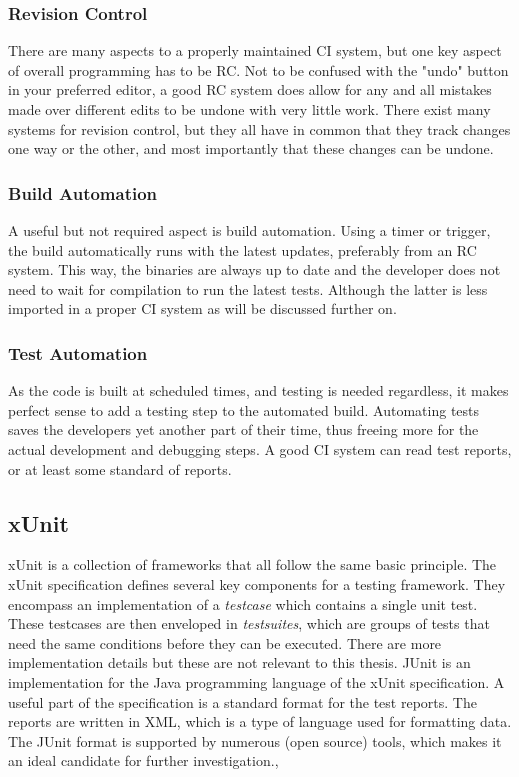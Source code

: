 \documentclass[11pt,british]{article}
\begin{document}
\subsubsection{Revision Control}
There are many aspects to a properly maintained \gls{CI} system, but one key aspect of overall programming has to be \gls{RC}. Not to be confused with the "undo" button in your preferred editor, a good \gls{RC} system does allow for any and all mistakes made over different edits to be undone with very little work. There exist many systems for revision control, but they all have in common that they track changes one way or the other, and most importantly that these changes can be undone. 

\subsubsection{Build Automation}
A useful but not required aspect is build automation. Using a timer or trigger, the build automatically runs with the latest updates, preferably from an \gls{RC} system. This way, the binaries are always up to date and the developer does not need to wait for compilation to run the latest tests. Although the latter is less imported in a proper \gls{CI} system as will be discussed further on. 

\subsubsection{Test Automation}
As the code is built at scheduled times, and testing is needed regardless, it makes perfect sense to add a testing step to the automated build. Automating tests saves the developers yet another part of their time, thus freeing more for the actual development and debugging steps. A good \gls{CI} system can read test reports, or at least some standard of reports. 

\subsection{xUnit}
\label{subsec:xUnit}
xUnit is a collection of frameworks that all follow the same basic principle. The xUnit specification defines several key components for a testing framework. They encompass an implementation of a \emph{testcase} which contains a single unit test. These testcases are then enveloped in \emph{testsuites}, which are groups of tests that need the same conditions before they can be executed.  There are more implementation details but these are not relevant to this thesis. JUnit is an implementation for the Java programming language of the xUnit specification. A useful part of the specification is a standard format for the test reports. The reports are written in \gls{XML}, which is a type of language used for formatting data. The JUnit format is supported by numerous (open source) tools, which makes it an ideal candidate for further investigation.\cite{xunit}, \cite{junitxml}
\end{document}
